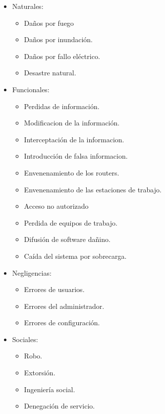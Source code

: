 \documentclass[a4paper,onecolumn,11pt]{article}
\begin{document}
\begin{itemize}
\item Naturales:
	\begin{itemize}
	\item Daños por fuego
	\item Daños por inundación.
	\item Daños por fallo eléctrico.
	\item Desastre natural.
	\end{itemize}
\item Funcionales:
	\begin{itemize}
	\item Perdidas de información.
	\item Modificacion de la información.
	\item Interceptación de la informacion.
	\item Introducción de falsa informacion.
	\item Envenenamiento de los routers.
	\item Envenenamiento de las estaciones de trabajo.
	\item Acceso no autorizado
	\item Perdida de equipos de trabajo.
	\item Difusión de software dañino.
	\item Caída del sistema por sobrecarga.
	\end{itemize}
\item Negligencias:
	\begin{itemize}
	\item Errores de usuarios.
	\item Errores del administrador.
	\item Errores de configuración.
	\end{itemize}
\item Sociales:
	\begin{itemize}
	\item Robo.
	\item Extorsión.
	\item Ingeniería social.
	\item Denegación de servicio.
	\end{itemize}
\end{itemize}
\end{document}
